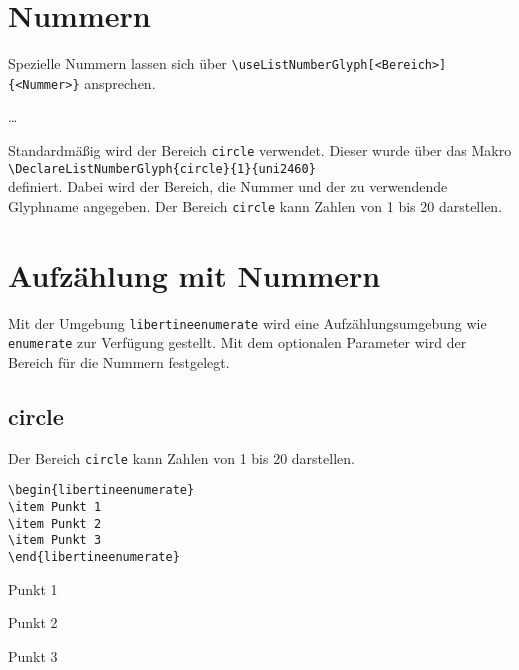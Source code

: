 \documentclass[ngerman]{libertinedoku}
\begin{document}

\section{Nummern}

Spezielle Nummern lassen sich über \verb|\useListNumberGlyph[<Bereich>]{<Nummer>}|
ansprechen.

\bigskip
{\Huge
{}
\dots
{}
}

\bigskip
Standardmäßig wird der Bereich \texttt{circle} verwendet. Dieser wurde über das Makro\\
\verb|\DeclareListNumberGlyph{circle}{1}{uni2460}|\\ definiert. Dabei wird der Bereich,
die Nummer und der zu verwendende Glyphname angegeben. Der Bereich \texttt{circle} kann
Zahlen von 1 bis 20 darstellen.


\section{Aufzählung mit Nummern}

Mit der Umgebung \texttt{libertineenumerate} wird eine Aufzählungsumgebung wie
\texttt{enumerate} zur Verfügung gestellt. Mit dem optionalen Parameter
wird der Bereich für die Nummern festgelegt.

\subsection{circle}

Der Bereich \texttt{circle} kann Zahlen von 1 bis 20 darstellen.


\begin{minipage}{\linewidth}
\begin{minipage}{.48\linewidth}
\begin{lstlisting}
\begin{libertineenumerate}
\item Punkt 1
\item Punkt 2
\item Punkt 3
\end{libertineenumerate}
\end{lstlisting}
\end{minipage}\hfill
\begin{minipage}{.48\linewidth}
\begin{libertineenumerate}
\item Punkt 1
\item Punkt 2
\item Punkt 3
\end{libertineenumerate}
\end{minipage}
\end{minipage}
\end{document}
